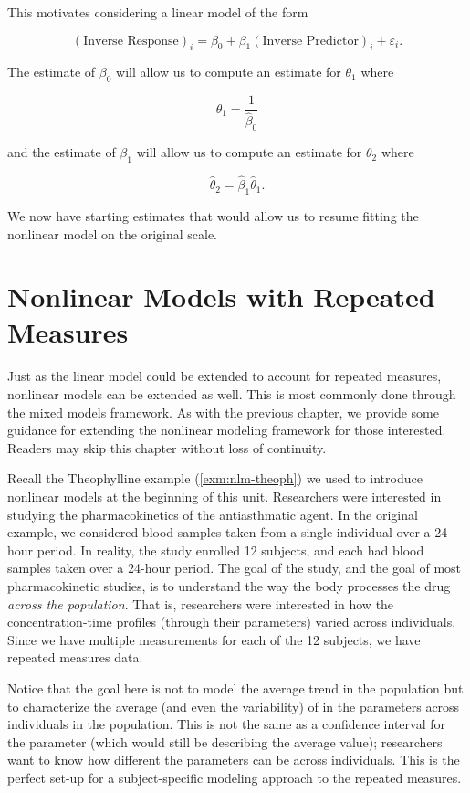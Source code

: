 \documentclass[
]{book}
\theoremstyle{plain}
\theoremstyle{mydefn}
\theoremstyle{myexmpl}
\theoremstyle{remark}
\begin{document}
This motivates considering a linear model of the form

\[(\text{Inverse Response})_i = \beta_0 + \beta_1 (\text{Inverse Predictor})_i + \varepsilon_i.\]

The estimate of \(\beta_0\) will allow us to compute an estimate for \(\theta_1\) where

\[\widehat{\theta}_1 = \frac{1}{\widehat{\beta}_0}\]

and the estimate of \(\beta_1\) will allow us to compute an estimate for \(\theta_2\) where

\[\widehat{\theta}_2 = \widehat{\beta}_1 \widehat{\theta}_1.\]

We now have starting estimates that would allow us to resume fitting the nonlinear model on the original scale.

\hypertarget{nlm-rm}{%
\chapter{Nonlinear Models with Repeated Measures}\label{nlm-rm}}

Just as the linear model could be extended to account for repeated measures, nonlinear models can be extended as well. This is most commonly done through the mixed models framework. As with the previous chapter, we provide some guidance for extending the nonlinear modeling framework for those interested. Readers may skip this chapter without loss of continuity.

Recall the Theophylline example (\ref{exm:nlm-theoph}) we used to introduce nonlinear models at the beginning of this unit. Researchers were interested in studying the pharmacokinetics of the antiasthmatic agent. In the original example, we considered blood samples taken from a single individual over a 24-hour period. In reality, the study enrolled 12 subjects, and each had blood samples taken over a 24-hour period. The goal of the study, and the goal of most pharmacokinetic studies, is to understand the way the body processes the drug \emph{across the population}. That is, researchers were interested in how the concentration-time profiles (through their parameters) varied across individuals. Since we have multiple measurements for each of the 12 subjects, we have repeated measures data.

Notice that the goal here is not to model the average trend in the population but to characterize the average (and even the variability) of in the parameters across individuals in the population. This is not the same as a confidence interval for the parameter (which would still be describing the average value); researchers want to know how different the parameters can be across individuals. This is the perfect set-up for a subject-specific modeling approach to the repeated measures.
\end{document}
